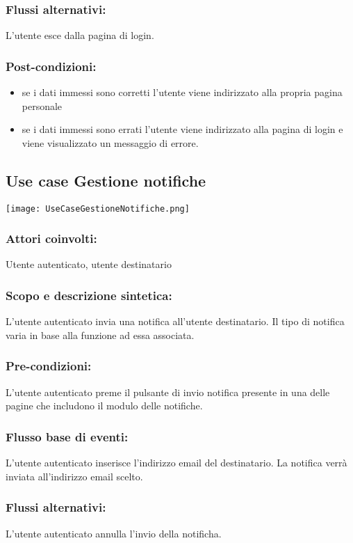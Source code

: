 \documentclass[11pt,a4paper]{article}
\begin{document}
\subsubsection*{Flussi alternativi:}
L'utente esce dalla pagina di login.
\subsubsection*{Post-condizioni:}
\begin{itemize}
 \item se i dati immessi sono corretti l'utente viene indirizzato alla propria pagina personale
 \item se i dati immessi sono errati l'utente viene indirizzato alla pagina di login e viene visualizzato un messaggio di errore. 
\end{itemize}

\subsection{Use case Gestione notifiche}
\begin{center} 
 \texttt{[image: UseCaseGestioneNotifiche.png]} 
\end{center}
\subsubsection*{Attori coinvolti:}
Utente autenticato, utente destinatario
\subsubsection*{Scopo e descrizione sintetica:}
L'utente autenticato invia una notifica all'utente destinatario. Il tipo di notifica varia in base alla funzione ad essa associata.
\subsubsection*{Pre-condizioni:}
L'utente autenticato preme il pulsante di invio notifica presente in una delle pagine che includono il modulo delle notifiche.
\subsubsection*{Flusso base di eventi:}
L'utente autenticato inserisce l'indirizzo email del destinatario.
La notifica verrà inviata all'indirizzo email scelto.
\subsubsection*{Flussi alternativi:}
L'utente autenticato annulla l'invio della notificha.
\end{document}
